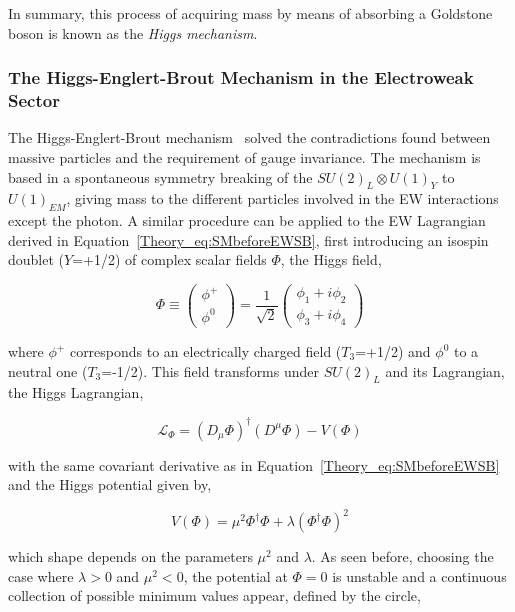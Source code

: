 In summary, this process of acquiring mass by means of absorbing a Goldstone boson is known as the \textit{Higgs mechanism}.

\subsubsection{The Higgs-Englert-Brout Mechanism in the Electroweak Sector}

The Higgs-Englert-Brout mechanism~\cite{Higgs1,Higgs2,Englert} solved the contradictions found between massive particles and
the requirement of gauge invariance. The mechanism is based in a spontaneous symmetry breaking of the $SU(2)_L\otimes U(1)_Y$ to $U(1)_{EM}$,
giving mass to the different particles involved in the \acrshort{EW} interactions except the photon.
A similar procedure can be applied to the EW Lagrangian derived in Equation~\ref{Theory_eq:SMbeforeEWSB},
first introducing an isospin doublet ($Y$=+1/2) of complex scalar fields $\Phi$, the Higgs field,

\begin{equation}
    \Phi\equiv
    \begin{pmatrix} \phi^+ \\ \phi^0 \end{pmatrix}
    =\frac{1}{\sqrt{2}}
    \begin{pmatrix} \phi_1 + i\phi_2 \\ \phi_3 + i\phi_4 \end{pmatrix}
\end{equation}

where $\phi^+$ corresponds to an electrically charged field ($T_3$=+1/2) and $\phi^0$ to a neutral one ($T_3$=-1/2).
This field transforms under $SU(2)_L$ and its Lagrangian, the Higgs Lagrangian,

\begin{equation}
    \mathcal{L}_\Phi = (D_\mu\Phi)^\dag(D^\mu\Phi)-V(\Phi)
\end{equation}

with the same covariant derivative as in Equation~\ref{Theory_eq:SMbeforeEWSB} and the Higgs potential given by,

\begin{equation}
    V(\Phi) = \mu^2\Phi^\dag\Phi+\lambda(\Phi^\dag\Phi)^2
\end{equation}

which shape depends on the parameters $\mu^2$ and $\lambda$. As seen before, choosing the case where $\lambda>0$ and $\mu^2<0$,
the potential at $\Phi=0$ is unstable and a continuous collection of possible minimum values appear, defined by the circle,

